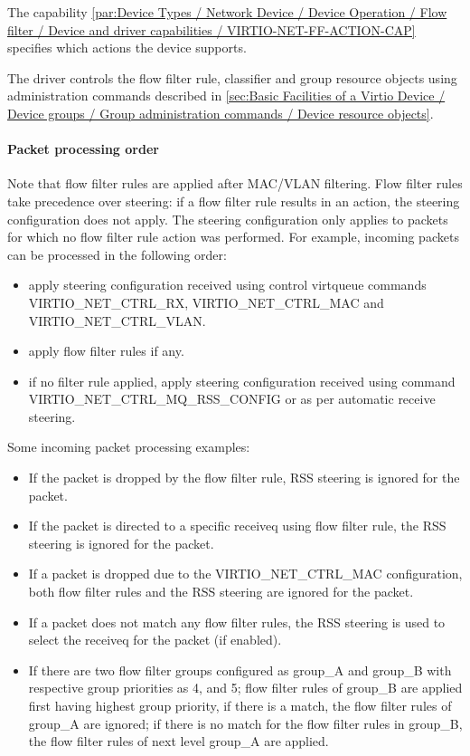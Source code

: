 The capability \ref{par:Device Types / Network Device / Device Operation / Flow filter / Device and driver capabilities / VIRTIO-NET-FF-ACTION-CAP} specifies which actions the device supports.

The driver controls the flow filter rule, classifier and group resource objects using
administration commands described in
\ref{sec:Basic Facilities of a Virtio Device / Device groups / Group administration commands / Device resource objects}.

\paragraph{Packet processing order}\label{sec:sec:Device Types / Network Device / Device Operation / Flow filter / Packet processing order}

Note that flow filter rules are applied after MAC/VLAN filtering. Flow filter
rules take precedence over steering: if a flow filter rule results in an action,
the steering configuration does not apply. The steering configuration only applies
to packets for which no flow filter rule action was performed. For example,
incoming packets can be processed in the following order:

\begin{itemize}
\item apply steering configuration received using control virtqueue commands
      VIRTIO_NET_CTRL_RX, VIRTIO_NET_CTRL_MAC and VIRTIO_NET_CTRL_VLAN.
\item apply flow filter rules if any.
\item if no filter rule applied, apply steering configuration received using command
      VIRTIO_NET_CTRL_MQ_RSS_CONFIG or as per automatic receive steering.
\end{itemize}

Some incoming packet processing examples:
\begin{itemize}
\item If the packet is dropped by the flow filter rule, RSS
      steering is ignored for the packet.
\item If the packet is directed to a specific receiveq using flow filter rule,
      the RSS steering is ignored for the packet.
\item If a packet is dropped due to the VIRTIO_NET_CTRL_MAC configuration,
      both flow filter rules and the RSS steering are ignored for the packet.
\item If a packet does not match any flow filter rules,
      the RSS steering is used to select the receiveq for the packet (if enabled).
\item If there are two flow filter groups configured as group_A and group_B
      with respective group priorities as 4, and 5; flow filter rules of
      group_B are applied first having highest group priority, if there is a match,
      the flow filter rules of group_A are ignored; if there is no match for
      the flow filter rules in group_B, the flow filter rules of next level group_A are applied.
\end{itemize}


